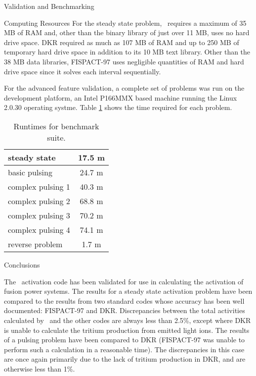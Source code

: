 \begin{chapter}{Validation and Benchmarking\label{chap:valid}}
\begin{section}{Computing Resources}
    For the steady state problem, \ALARA\ requires a maximum of 35 MB
    of RAM and, other than the binary library of just over 11 MB, uses
    no hard drive space.  DKR required as much as 107 MB of RAM and up
    to 250 MB of temporary hard drive space in addition to its 10 MB
    text library.  Other than the 38 MB data libraries, FISPACT-97
    uses negligible quantities of RAM and hard drive space since it
    solves each interval sequentially.
    
    For the advanced feature validation, a complete set of problems
    was run on the development platform, an Intel P166MMX based
    machine running the Linux 2.0.30 operating systme.  Table
    \ref{tab:valid.runtime} shows the time required for each problem.

    \begin{table}[htbp]
      \begin{center}
        \leavevmode
        \begin{tabular}{|l|c|}
          \hline
          steady state & 17.5 m\\\hline
          basic pulsing & 24.7 m\\\hline\hline
          complex pulsing 1 & 40.3 m\\\hline
          complex pulsing 2 & 68.8 m\\\hline
          complex pulsing 3 & 70.2 m\\\hline
          complex pulsing 4 & 74.1 m \\\hline
          reverse problem & 1.7 m\\\hline
        \end{tabular}
        \caption{Runtimes for benchmark suite.}
        \label{tab:valid.runtime}
      \end{center}
    \end{table}

  \end{section}
  
  \begin{section}{Conclusions}
    
    The \ALARA\ activation code has been validated for use in
    calculating the activation of fusion power systems.  The results
    for a steady state activation problem have been compared to the
    results from two standard codes whose accuracy has been well
    documented: FISPACT-97 and DKR.  Discrepancies between the total
    activities calculated by \ALARA\ and the other codes are always
    less than 2.5\%, except where DKR is unable to calculate the
    tritium production from emitted light ions.  The results of a
    pulsing problem have been compared to DKR (FISPACT-97 was unable
    to perform such a calculation in a reasonable time).  The
    discrepancies in this case are once again primarily due to the
    lack of tritium production in DKR, and are otherwise less than
    1\%.
    

\end{section}
\end{chapter}
